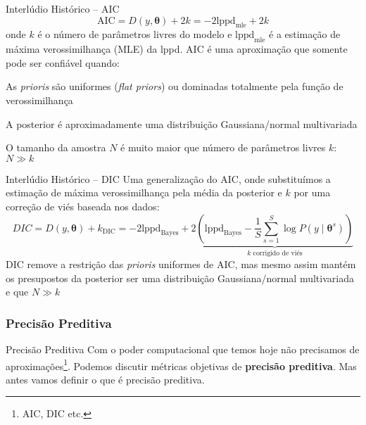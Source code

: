 \begin{frame}{Interlúdio Histórico -- AIC \parencite{akaike1998information}}
    $$\text{AIC} = D(y, \boldsymbol{\theta}) + 2k = -2 \text{lppd}_{\text{mle}} + 2k$$
    onde $k$ é o número de parâmetros livres do modelo e $\text{lppd}_{\text{mle}}$ é
    a estimação de máxima verossimilhança (MLE) da lppd.
    \vfill
    AIC é uma aproximação que somente pode ser confiável quando:
    \begin{vfilleditems}
        \item As \textit{prioris} são uniformes (\textit{flat priors}) ou dominadas totalmente pela função de verossimilhança
        \item A posterior é aproximadamente uma distribuição Gaussiana/normal multivariada
        \item O tamanho da amostra $N$ é muito maior que número de parâmetros livres $k$: $N \gg k$
    \end{vfilleditems}
\end{frame}

\begin{frame}{Interlúdio Histórico -- DIC \parencite{spiegelhalter2002bayesian}}
    Uma generalização do AIC, onde substituímos a estimação de máxima verossimilhança
    pela média da posterior e $k$ por uma correção de viés baseada nos dados:
    $$
    DIC = D(y, \boldsymbol{\theta}) + k_{\text{DIC}} = -2 \text{lppd}_{\text{Bayes}}
    +2 \underbrace{\left( \text{lppd}_{\text{Bayes}} - \frac{1}{S} \sum^S_{s=1} \log P(y \mid \boldsymbol{\theta}^s) \right)}_{\text{$k$ corrigido de viés}}
    $$
    DIC remove a restrição das \textit{prioris} uniformes de AIC, mas mesmo assim
    mantém os presupostos da posterior ser uma distribuição Gaussiana/normal multivariada
    e que $N \gg k$
\end{frame}

\subsubsection{Precisão Preditiva}
\begin{frame}{Precisão Preditiva}
    Com o poder computacional que temos hoje não precisamos de aproximações\footnote{AIC, DIC etc.}.
    \vfill
    Podemos discutir métricas objetivas de \textbf{precisão preditiva}.
    \vfill
    Mas antes vamos definir o que é precisão preditiva.
\end{frame}

